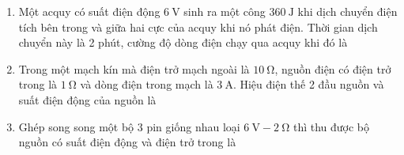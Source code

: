 \begin{enumerate}[label=\bfseries Câu \arabic*:]
\item Một acquy có suất điện động $\SI{6}{\volt}$ sinh ra một công $\SI{360}{\joule}$ khi dịch chuyển điện tích bên trong và giữa hai cực của acquy khi nó phát điện. Thời gian dịch chuyển này là 2 phút, cường độ dòng điện chạy qua acquy khi đó là

\item Trong một mạch kín mà điện trở mạch ngoài là $\SI{10}{\ohm}$, nguồn điện có điện trở trong là $\SI{1}{\ohm}$ và dòng điện trong mạch là $\SI{3}{\ampere}$. Hiệu điện thế 2 đầu nguồn và suất điện động của nguồn là

\item Ghép song song một bộ 3 pin giống nhau loại $\SI{6}{\volt}-\SI{2}{\ohm}$ thì thu được bộ nguồn có suất điện động và điện trở trong là


\end{enumerate}
